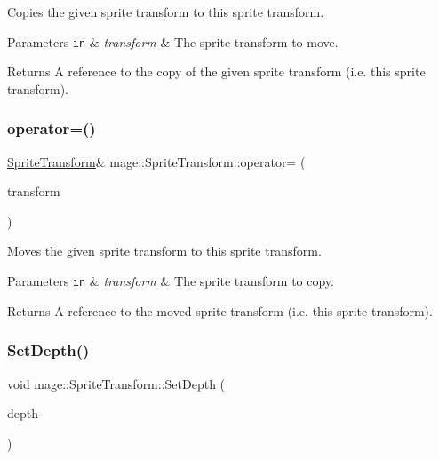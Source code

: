 Copies the given sprite transform to this sprite transform.


\begin{DoxyParams}[1]{Parameters}
\mbox{\tt in}  & {\em transform} & The sprite transform to move. \\
\hline
\end{DoxyParams}
\begin{DoxyReturn}{Returns}
A reference to the copy of the given sprite transform (i.\+e. this sprite transform). 
\end{DoxyReturn}
\hypertarget{structmage_1_1_sprite_transform_a9278d3fd0a6d346b188515b67a1adfc2}{}\label{structmage_1_1_sprite_transform_a9278d3fd0a6d346b188515b67a1adfc2} 
\subsubsection{\texorpdfstring{operator=()}{operator=()}\hspace{0.1cm}{\footnotesize\ttfamily [2/2]}}
{\footnotesize\ttfamily \hyperlink{structmage_1_1_sprite_transform}{Sprite\+Transform}\& mage\+::\+Sprite\+Transform\+::operator= (\begin{DoxyParamCaption}\item[{\hyperlink{structmage_1_1_sprite_transform}{Sprite\+Transform} \&\&}]{transform }\end{DoxyParamCaption})\hspace{0.3cm}{\ttfamily [default]}}

Moves the given sprite transform to this sprite transform.


\begin{DoxyParams}[1]{Parameters}
\mbox{\tt in}  & {\em transform} & The sprite transform to copy. \\
\hline
\end{DoxyParams}
\begin{DoxyReturn}{Returns}
A reference to the moved sprite transform (i.\+e. this sprite transform). 
\end{DoxyReturn}
\hypertarget{structmage_1_1_sprite_transform_a99da2aa3c134db3f4a72660befe1ca9a}{}\label{structmage_1_1_sprite_transform_a99da2aa3c134db3f4a72660befe1ca9a} 
\subsubsection{\texorpdfstring{Set\+Depth()}{SetDepth()}}
{\footnotesize\ttfamily void mage\+::\+Sprite\+Transform\+::\+Set\+Depth (\begin{DoxyParamCaption}\item[{\hyperlink{namespacemage_aa97e833b45f06d60a0a9c4fc22ae02c0}{F32}}]{depth }\end{DoxyParamCaption})\hspace{0.3cm}{\ttfamily [noexcept]}}

